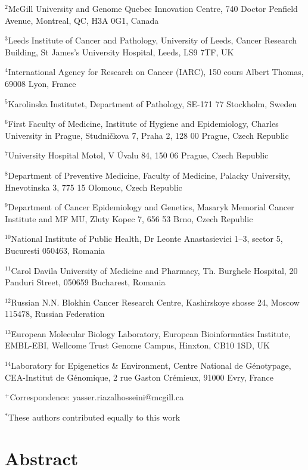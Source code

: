 $^2$McGill University and Genome Quebec Innovation Centre, 740 Doctor
Penfield Avenue, Montreal, QC, H3A 0G1, Canada

$^3$Leeds Institute of Cancer and Pathology, University of Leeds,
Cancer Research Building, St James's University Hospital, Leeds, LS9
7TF, UK

$^4$International Agency for Research on Cancer (IARC), 150 cours
Albert Thomas, 69008 Lyon, France

$^5$Karolinska Institutet, Department of Pathology, SE-171 77
Stockholm, Sweden

$^6$First Faculty of Medicine, Institute of Hygiene and Epidemiology,
Charles University in Prague, Studničkova 7, Praha 2, 128 00 Prague,
Czech Republic

$^7$University Hospital Motol, V Úvalu 84, 150 06 Prague, Czech
Republic

$^8$Department of Preventive Medicine, Faculty of Medicine, Palacky
University, Hnevotinska 3, 775 15 Olomouc, Czech Republic

$^9$Department of Cancer Epidemiology and Genetics, Masaryk Memorial
Cancer Institute and MF MU, Zluty Kopec 7, 656 53 Brno, Czech Republic

$^{10}$National Institute of Public Health, Dr Leonte Anastasievici 1--3,
sector 5, Bucuresti 050463, Romania

$^{11}$Carol Davila University of Medicine and Pharmacy, Th. Burghele
Hospital, 20 Panduri Street, 050659 Bucharest, Romania

$^{12}$Russian N.N. Blokhin Cancer Research Centre, Kashirskoye shosse
24, Moscow 115478, Russian Federation

$^{13}$European Molecular Biology Laboratory, European Bioinformatics
Institute, EMBL-EBI, Wellcome Trust Genome Campus, Hinxton, CB10 1SD, UK

$^{14}$Laboratory for Epigenetics \& Environment, Centre National de
Génotypage, CEA-Institut de Génomique, 2 rue Gaston Crémieux, 91000
Evry, France

$^+$Correspondence: yasser.riazalhosseini@mcgill.ca

$^*$These authors contributed equally to this work

\normalsize
\doublespacing

\section{Abstract}

